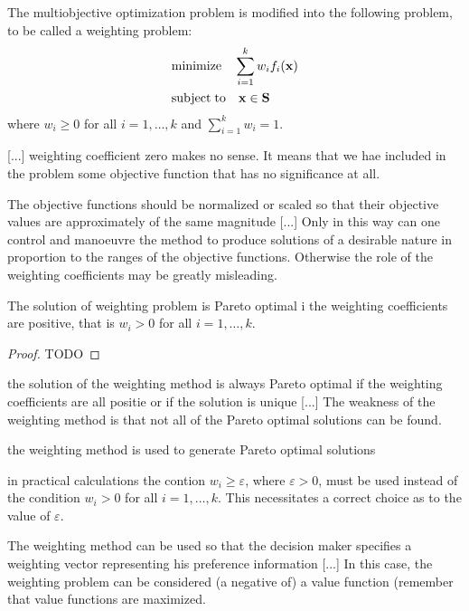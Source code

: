 {{\color{red} The multiobjective optimization problem is modified into the following problem, to be called a weighting problem:}
\begin{align*}
     & \text{minimize}    \quad \sum_{i=1}^k  w_i  f_i(\mathbf{x}) \\
     & \text{subject\;to} \quad \mathbf{x} \in \mathbf{S}
\end{align*}
{\color{red} where $w_i \geq 0$ for all $i = 1, \ldots, k$ and $\sum_{i=1}^k w_i = 1$.}

{\color{red} [...] weighting coefficient zero makes no sense. It means that we hae included in the problem some objective function that has no significance at all.}

{\color{red} The objective functions should be normalized or scaled so that their objective values are approximately of the same magnitude [...] Only in this way can one control and manoeuvre the method to produce solutions of a desirable nature in proportion to the ranges of the objective functions. Otherwise the role of the weighting coefficients may be greatly misleading.}

\begin{proposition}
{\color{red} The solution of weighting problem is Pareto optimal i the weighting coefficients are positive, that is $w_i > 0$ for all $i = 1, \ldots, k$.}
\end{proposition}
\begin{proof}
{\color{red} TODO}
\end{proof}

{\color{red} the solution of the weighting method is always Pareto optimal if the weighting coefficients are all positie or if the solution is unique [...] The weakness of the weighting method is that not all of the Pareto optimal solutions can be found.}

{\color{red} the weighting method is used to generate Pareto optimal solutions}

{\color{red} in practical calculations the contion $w_i \geq \varepsilon$, where $\varepsilon > 0$, must be used instead of the condition $w_i > 0$ for all $i = 1, \ldots, k$. This necessitates a correct choice as to the value of $\varepsilon$.}

{\color{red} The weighting method can be used so that the decision maker specifies a weighting vector representing his preference information [...] In this case, the weighting problem can be considered (a negative of) a value function (remember that value functions are maximized.}

}
